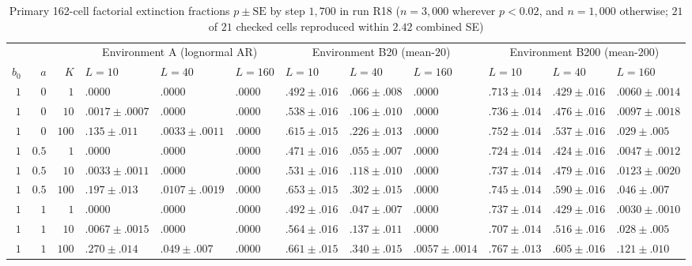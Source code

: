 \begin{table}[htbp]\centering\scriptsize
\setlength{\tabcolsep}{1.8pt}
\caption{Primary 162-cell factorial extinction fractions $p \pm \mathrm{SE}$ by step $1{,}700$ in run R18 ($n = 3{,}000$ wherever $p < 0.02$, and $n = 1{,}000$ otherwise; $21$ of $21$ checked cells reproduced within $2.42$ combined SE)}\label{num-esm-tab-r18-main}
\begin{tabular}{rrr|lll|lll|lll}\toprule
 & & & \multicolumn{3}{c|}{Environment A (lognormal AR)} & \multicolumn{3}{c|}{Environment B20 (mean-$20$)} & \multicolumn{3}{c}{Environment B200 (mean-$200$)}\\
$b_0$ & $a$ & $K$ & $L=10$ & $L=40$ & $L=160$ & $L=10$ & $L=40$ & $L=160$ & $L=10$ & $L=40$ & $L=160$\\\midrule
$1$ & $0$ & $1$ & $.0000$ & $.0000$ & $.0000$ & $.492 \pm .016$ & $.066 \pm .008$ & $.0000$ & $.713 \pm .014$ & $.429 \pm .016$ & $.0060 \pm .0014$\\
$1$ & $0$ & $10$ & $.0017 \pm .0007$ & $.0000$ & $.0000$ & $.538 \pm .016$ & $.106 \pm .010$ & $.0000$ & $.736 \pm .014$ & $.476 \pm .016$ & $.0097 \pm .0018$\\
$1$ & $0$ & $100$ & $.135 \pm .011$ & $.0033 \pm .0011$ & $.0000$ & $.615 \pm .015$ & $.226 \pm .013$ & $.0000$ & $.752 \pm .014$ & $.537 \pm .016$ & $.029 \pm .005$\\
$1$ & $0.5$ & $1$ & $.0000$ & $.0000$ & $.0000$ & $.471 \pm .016$ & $.055 \pm .007$ & $.0000$ & $.724 \pm .014$ & $.424 \pm .016$ & $.0047 \pm .0012$\\
$1$ & $0.5$ & $10$ & $.0033 \pm .0011$ & $.0000$ & $.0000$ & $.531 \pm .016$ & $.118 \pm .010$ & $.0000$ & $.737 \pm .014$ & $.479 \pm .016$ & $.0123 \pm .0020$\\
$1$ & $0.5$ & $100$ & $.197 \pm .013$ & $.0107 \pm .0019$ & $.0000$ & $.653 \pm .015$ & $.302 \pm .015$ & $.0000$ & $.745 \pm .014$ & $.590 \pm .016$ & $.046 \pm .007$\\
$1$ & $1$ & $1$ & $.0000$ & $.0000$ & $.0000$ & $.492 \pm .016$ & $.047 \pm .007$ & $.0000$ & $.737 \pm .014$ & $.429 \pm .016$ & $.0030 \pm .0010$\\
$1$ & $1$ & $10$ & $.0067 \pm .0015$ & $.0000$ & $.0000$ & $.564 \pm .016$ & $.137 \pm .011$ & $.0000$ & $.707 \pm .014$ & $.516 \pm .016$ & $.028 \pm .005$\\
$1$ & $1$ & $100$ & $.270 \pm .014$ & $.049 \pm .007$ & $.0000$ & $.661 \pm .015$ & $.340 \pm .015$ & $.0057 \pm .0014$ & $.767 \pm .013$ & $.605 \pm .016$ & $.121 \pm .010$\\\midrule

\end{tabular}
\end{table}
